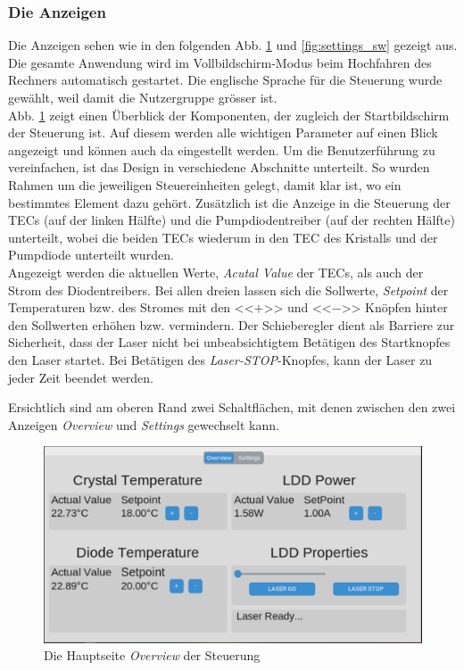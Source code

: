 \subsubsection{Die Anzeigen}
Die Anzeigen sehen wie in den folgenden Abb. \ref{fig:overview_sw} und \ref{fig:settings_sw} gezeigt aus. Die gesamte Anwendung wird im Vollbildschirm-Modus beim Hochfahren des Rechners automatisch gestartet. Die englische Sprache für die Steuerung wurde gewählt, weil damit die Nutzergruppe grösser ist.\\
Abb. \ref{fig:overview_sw} zeigt einen Überblick der Komponenten, der zugleich der Startbildschirm der Steuerung ist. Auf diesem werden alle wichtigen Parameter auf einen Blick angezeigt und können auch da eingestellt werden. Um die Benutzerführung zu vereinfachen, ist das Design in verschiedene Abschnitte unterteilt. So wurden Rahmen um die jeweiligen Steuereinheiten gelegt, damit klar ist, wo ein bestimmtes Element dazu gehört. Zusätzlich ist die Anzeige in die Steuerung der TECs (auf der linken Hälfte) und die Pumpdiodentreiber (auf der rechten Hälfte) unterteilt, wobei die beiden TECs wiederum in den TEC des Kristalls und der Pumpdiode unterteilt wurden.\\
Angezeigt werden die aktuellen Werte, \textit{Acutal Value} der TECs, als auch der Strom des Diodentreibers. Bei allen dreien lassen sich die Sollwerte, \textit{Setpoint} der Temperaturen bzw. des Stromes mit den <<$+$>> und <<$-$>> Knöpfen hinter den Sollwerten erhöhen bzw. vermindern.
Der Schieberegler dient als Barriere zur Sicherheit, dass der Laser nicht bei unbeabsichtigtem Betätigen des Startknopfes den Laser startet. Bei Betätigen des \textit{Laser-STOP}-Knopfes, kann der Laser zu jeder Zeit beendet werden.

Ersichtlich sind am oberen Rand zwei Schaltflächen, mit denen zwischen den zwei Anzeigen \textit{Overview} und \textit{Settings} gewechselt kann.

\begin{figure}[H]
    \centering
    \includegraphics[scale=0.3, trim={1mm 1mm 1mm 1mm}, clip]{98_images/window_overview_large_04.PNG}
    \caption{Die Hauptseite \textit{Overview} der Steuerung}
    \label{fig:overview_sw}
\end{figure}


